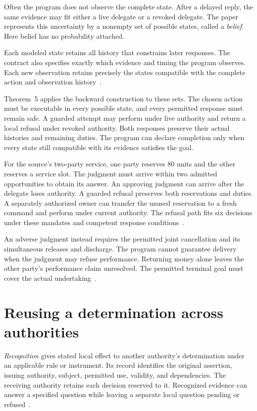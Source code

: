 \documentclass{momentum}
\begin{document}
Often the program does not observe the complete state.
After a delayed reply, the same evidence may fit either a live delegate or a revoked delegate.
The paper represents this uncertainty by a nonempty set of possible states, called a \emph{belief}.
Here belief has no probability attached.

Each modeled state retains all history that constrains later responses.
The contract also specifies exactly which evidence and timing the program observes.
Each new observation retains precisely the states compatible with the complete action and observation history~\cite[Section~7.8]{institutions}.

Theorem~5 applies the backward construction to these sets.
The chosen action must be executable in every possible state, and every permitted response must remain safe.
A guarded attempt may perform under live authority and return a local refusal under revoked authority.
Both responses preserve their actual histories and remaining duties.
The program can declare completion only when every state still compatible with its evidence satisfies the goal.

For the source's two-party service, one party reserves 80 units and the other reserves a service slot.
The judgment must arrive within two admitted opportunities to obtain its answer.
An approving judgment can arrive after the delegate loses authority.
A guarded refusal preserves both reservations and duties.
A separately authorized owner can transfer the unused reservation to a fresh command and perform under current authority.
The refusal path fits six decisions under these mandates and competent response conditions~\cite[Section~7.8, Example~1]{institutions}.

An adverse judgment instead requires the permitted joint cancellation and its simultaneous releases and discharge.
The program cannot guarantee delivery when the judgment may refuse performance.
Returning money alone leaves the other party's performance claim unresolved.
The permitted terminal goal must cover the actual undertaking~\cite[Section~7.8, Example~1]{institutions}.

\section{Reusing a determination across authorities}
\label{sec:recognition}

\emph{Recognition} gives stated local effect to another authority's determination under an applicable rule or instrument.
Its record identifies the original assertion, issuing authority, subject, permitted use, validity, and dependencies.
The receiving authority retains each decision reserved to it.
Recognized evidence can answer a specified question while leaving a separate local question pending or refused~\cite[Sections~2 and 5]{entity}.
\end{document}
